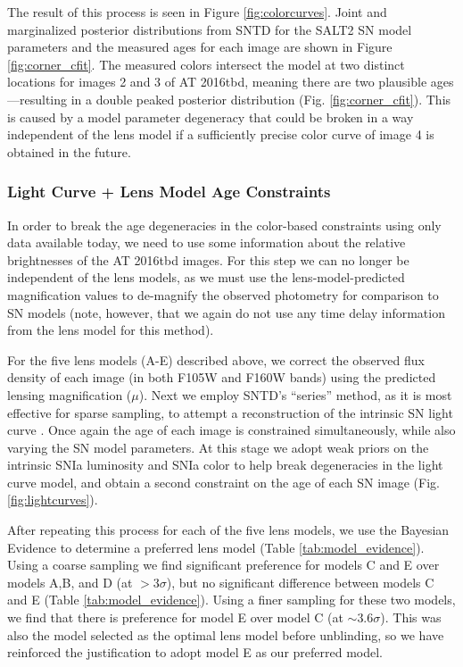 \documentclass[12pt]{article}
\def\SNABC{AT 2016tbd\xspace}
\begin{document}
The result of this process is seen in Figure \ref{fig:colorcurves}.  Joint and marginalized posterior distributions
from SNTD for the SALT2 SN model parameters and the measured ages for each image are shown in Figure \ref{fig:corner_cfit}.  The measured colors intersect the model at two distinct locations for images 2 and 3 of \SNABC, meaning there are two plausible ages---resulting in a double peaked posterior distribution (Fig. \ref{fig:corner_cfit}). This is caused by a model parameter degeneracy that could be broken in a way independent of the lens model if a sufficiently precise color curve of image 4 is obtained in the future.


\subsubsection*{Light Curve + Lens Model Age Constraints}

In order to break the age degeneracies in the color-based constraints using only data available today, we need to use some information about the relative brightnesses of the \SNABC images.  For this step we can no longer be independent of the lens models, as we must use the lens-model-predicted magnification values to de-magnify the observed photometry for comparison to SN models (note, however, that we again do not use any time delay information from the lens model for this method).

For the five lens models (A-E) described above, we correct the observed flux density of each image (in both F105W and F160W bands) using the predicted lensing magnification ($\mu$). Next we employ SNTD's ``series'' method, as it is most effective for sparse sampling, to attempt a reconstruction of the intrinsic SN light curve \cite{pierel_turning_2019}. Once again the age of each image is constrained simultaneously, while also varying the SN model parameters. At this stage we adopt weak priors on the intrinsic SNIa luminosity \cite{wang_determination_2006} and SNIa color \cite{mosher_cosmological_2014} to help break degeneracies in the light curve model, and obtain a second constraint on the age of each SN image (Fig. \ref{fig:lightcurves}). 

After repeating this process for each of the five lens models, we use the Bayesian Evidence to determine a preferred lens model (Table \ref{tab:model_evidence}). Using a coarse sampling we find significant preference for models C and E over models A,B, and D (at $>3\sigma$), but no significant difference between models C and E (Table \ref{tab:model_evidence}). Using a finer sampling for these two models, we find that there is preference for model E over model C (at $\sim3.6\sigma$).  This was also the model selected as the optimal lens model before unblinding, so we have reinforced the justification to adopt model E as our preferred model.
\end{document}

